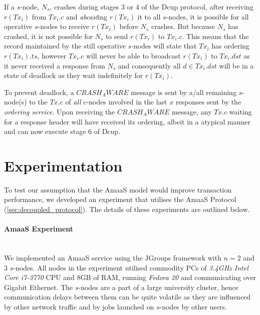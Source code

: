 	If a $s$-node, $N_s$, crashes during stages 3 or 4 of the \textsf{Dcup} protocol, after receiving $r(Tx_i)$ from $Tx_i.c$ and \emph{abcast}ing $r(Tx_i)$ it to all $s$-nodes, it is possible for all operative $s$-nodes to receive $r(Tx_i)$ before $N_s$ crashes.  But because $N_s$ has crashed, it is not possible for $N_s$ to send $r(Tx_i)$ to $Tx_i.c$.  This means that the record maintained by the still operative $s$-nodes will state that $Tx_i$ has ordering $r(Tx_i).ts$, however $Tx_i.c$ will never be able to broadcast $r(Tx_i)$ to $Tx_i.dst$ as it never received a response from $N_s$ and consequently all $d \in Tx_i.dst$ will be in a state of deadlock as they wait indefinitely for $r(Tx_i)$.  
	
	To prevent deadlock, a $CRASH_AWARE$ message is sent by a/all remaining $s$-node(s) to the $Tx.c$ of \emph{all} $c$-nodes involved in the last $x$ responses sent by the \emph{ordering service}.  Upon receiving the $CRASH_AWARE$ message, any $Tx.c$ waiting for a response header will have received its ordering, albeit in a atypical manner and can now execute stage 6 of \textsf{Dcup}.  
	
\section{Experimentation}

To test our assumption that the \textsf{AmaaS} model would improve transaction performance, we developed an experiment that utilises the \textsf{AmaaS} Protocol (\ref{sec:decoupled_protocol}).  The details of these experiments are outlined below. 

\paragraph{AmaaS Experiment} \hspace{0pt} \\
We implemented an \textsf{AmaaS} service using the JGroups\citep{JGroups} framework with $n=2$ and $3$ $s$-nodes.  All nodes in the experiment utilised commodity PCs of \emph{3.4GHz Intel Core i7-3770} CPU and 8GB of RAM, running \emph{Fedora 20} and communicating over Gigabit Ethernet. The $s$-nodes are a part of a large university cluster, hence communication delays between them can be quite volatile as they are influenced by other network traffic and by jobs launched on $s$-nodes by other users.

